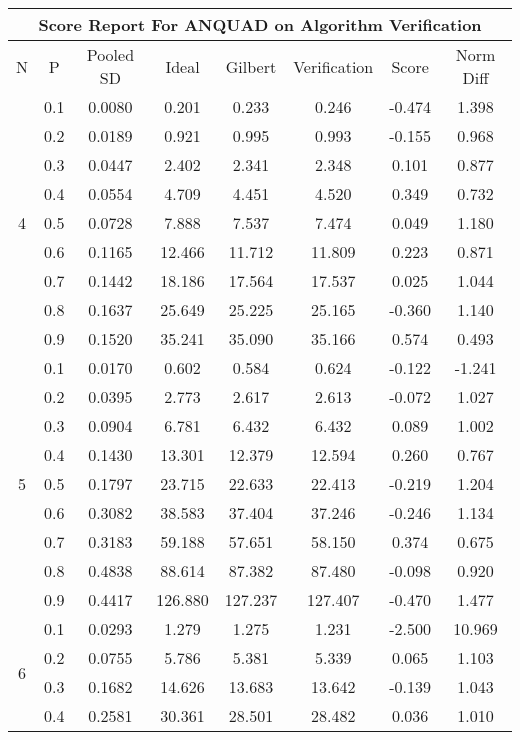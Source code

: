 \documentclass[11pt,a4paper]{report}
\begin{document}
\begin{longtable}{ | c | c || c | c | c | c | c | c | }
\hline
\multicolumn{8}{|c|}{ Score Report For ANQUAD on Algorithm Verification} \\
\hline
N & P & Pooled SD &  Ideal &  Gilbert & Verification  & Score & Norm Diff \\
 \hline
 \hline
 \endhead
\multirow{9}{*}{4} & 0.1 & 0.0080 & 0.201 & 0.233 & 0.246 & -0.474 & 1.398 \\
 & 0.2 & 0.0189 & 0.921 & 0.995 & 0.993 & -0.155 & 0.968 \\
 & 0.3 & 0.0447 & 2.402 & 2.341 & 2.348 & 0.101 & 0.877 \\
 & 0.4 & 0.0554 & 4.709 & 4.451 & 4.520 & 0.349 & 0.732 \\
 & 0.5 & 0.0728 & 7.888 & 7.537 & 7.474 & 0.049 & 1.180 \\
 & 0.6 & 0.1165 & 12.466 & 11.712 & 11.809 & 0.223 & 0.871 \\
 & 0.7 & 0.1442 & 18.186 & 17.564 & 17.537 & 0.025 & 1.044 \\
 & 0.8 & 0.1637 & 25.649 & 25.225 & 25.165 & -0.360 & 1.140 \\
 & 0.9 & 0.1520 & 35.241 & 35.090 & 35.166 & 0.574 & 0.493 \\
 \hline
\multirow{9}{*}{5} & 0.1 & 0.0170 & 0.602 & 0.584 & 0.624 & -0.122 & -1.241 \\
 & 0.2 & 0.0395 & 2.773 & 2.617 & 2.613 & -0.072 & 1.027 \\
 & 0.3 & 0.0904 & 6.781 & 6.432 & 6.432 & 0.089 & 1.002 \\
 & 0.4 & 0.1430 & 13.301 & 12.379 & 12.594 & 0.260 & 0.767 \\
 & 0.5 & 0.1797 & 23.715 & 22.633 & 22.413 & -0.219 & 1.204 \\
 & 0.6 & 0.3082 & 38.583 & 37.404 & 37.246 & -0.246 & 1.134 \\
 & 0.7 & 0.3183 & 59.188 & 57.651 & 58.150 & 0.374 & 0.675 \\
 & 0.8 & 0.4838 & 88.614 & 87.382 & 87.480 & -0.098 & 0.920 \\
 & 0.9 & 0.4417 & 126.880 & 127.237 & 127.407 & -0.470 & 1.477 \\
 \hline
\multirow{9}{*}{6} & 0.1 & 0.0293 & 1.279 & 1.275 & 1.231 & -2.500 & 10.969 \\
 & 0.2 & 0.0755 & 5.786 & 5.381 & 5.339 & 0.065 & 1.103 \\
 & 0.3 & 0.1682 & 14.626 & 13.683 & 13.642 & -0.139 & 1.043 \\
 & 0.4 & 0.2581 & 30.361 & 28.501 & 28.482 & 0.036 & 1.010 \\

\end{longtable}
\end{document}
